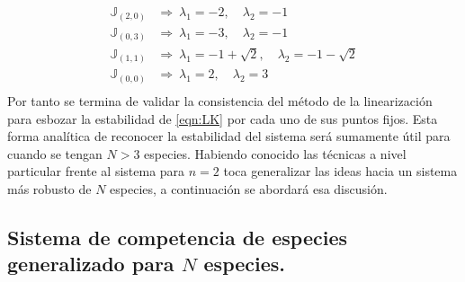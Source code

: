 \begin{align*}
	\mathbb{J}_{(2,0)}&\Longrightarrow\ \lambda_1 = -2,\quad\lambda_2 = -1\\
	\mathbb{J}_{(0,3)}&\Longrightarrow\ \lambda_1 = -3,\quad\lambda_2 = -1\\
	\mathbb{J}_{(1,1)}&\Longrightarrow\ \lambda_1 = -1+\sqrt{2},\quad\lambda_2 = -1-\sqrt{2}\\
	\mathbb{J}_{(0,0)}&\Longrightarrow\ \lambda_1 = 2,\quad\lambda_2 = 3\\
\end{align*}
Por tanto se termina de validar la consistencia del método de la linearización para esbozar la estabilidad de \ref{eqn:LK} por cada uno de sus puntos fijos. Esta forma analítica de reconocer la estabilidad del sistema será sumamente útil para cuando se tengan $N>3$ especies. Habiendo conocido las técnicas a nivel particular frente al sistema para $n=2$ toca generalizar las ideas hacia un sistema más robusto de $N$ especies, a continuación se abordará esa discusión.

\subsection{Sistema de competencia de especies generalizado para $N$ especies.}

